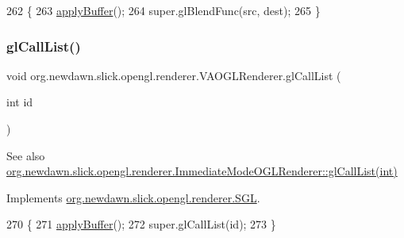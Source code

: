 \begin{DoxyCode}
262                                                \{
263         \mbox{\hyperlink{classorg_1_1newdawn_1_1slick_1_1opengl_1_1renderer_1_1_v_a_o_g_l_renderer_a7c5d09419cd40761be8f849631aebab5}{applyBuffer}}();
264         super.glBlendFunc(src, dest);
265     \}
\end{DoxyCode}
\mbox{\label{classorg_1_1newdawn_1_1slick_1_1opengl_1_1renderer_1_1_v_a_o_g_l_renderer_a555f7675fbd042770b6bf759169a48a6}} 
\subsubsection{\texorpdfstring{gl\+Call\+List()}{glCallList()}}
{\footnotesize\ttfamily void org.\+newdawn.\+slick.\+opengl.\+renderer.\+V\+A\+O\+G\+L\+Renderer.\+gl\+Call\+List (\begin{DoxyParamCaption}\item[{int}]{id }\end{DoxyParamCaption})\hspace{0.3cm}{\ttfamily [inline]}}

\begin{DoxySeeAlso}{See also}
\mbox{\hyperlink{classorg_1_1newdawn_1_1slick_1_1opengl_1_1renderer_1_1_immediate_mode_o_g_l_renderer_a30770752ebb5e2bbc31f322368dfa46e}{org.\+newdawn.\+slick.\+opengl.\+renderer.\+Immediate\+Mode\+O\+G\+L\+Renderer\+::gl\+Call\+List(int)}} 
\end{DoxySeeAlso}


Implements \mbox{\hyperlink{interfaceorg_1_1newdawn_1_1slick_1_1opengl_1_1renderer_1_1_s_g_l_a8482d9603203e93027e90042db3f561a}{org.\+newdawn.\+slick.\+opengl.\+renderer.\+S\+GL}}.


\begin{DoxyCode}
270                                    \{
271         \mbox{\hyperlink{classorg_1_1newdawn_1_1slick_1_1opengl_1_1renderer_1_1_v_a_o_g_l_renderer_a7c5d09419cd40761be8f849631aebab5}{applyBuffer}}();
272         super.glCallList(\textcolor{keywordtype}{id});
273     \}
\end{DoxyCode}
\mbox{\label{classorg_1_1newdawn_1_1slick_1_1opengl_1_1renderer_1_1_v_a_o_g_l_renderer_a5176ec9b2344f1fc899dac99cb34291d}} 
